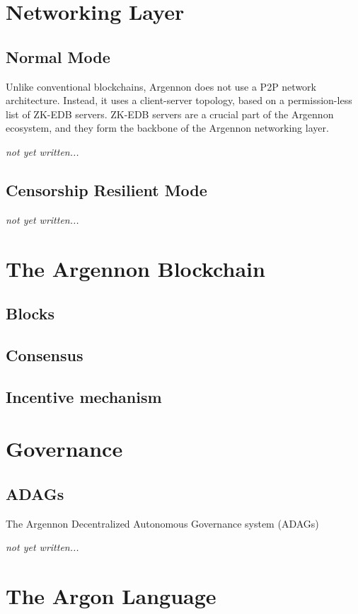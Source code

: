 \documentclass[11pt, a4paper]{report}
\newcommand{\note}[1] {
    \begin{tcolorbox}[colframe=white,colback=white]
        \emph{#1}
    \end{tcolorbox}
}
\begin{document}
    \chapter{Networking Layer}\label{ch:networking}


    \section{Normal Mode}\label{sec:normal-mode}
    Unlike conventional blockchains, Argennon does not use a P2P network architecture. Instead, it uses a
    client-server topology, based on a permission-less list of ZK-EDB servers. ZK-EDB servers are a
    crucial part of the Argennon ecosystem, and they form the backbone of the Argennon networking layer.
    \note{not yet written...}


    \section{Censorship Resilient Mode}\label{sec:cens-res-mode}
    \note{not yet written...}


    \chapter{The Argennon Blockchain}\label{ch:argennon-blockchain}


    \section{Blocks}\label{sec:blocks}
    


    \section{Consensus}\label{sec:consensus}
    

    


    \section{Incentive mechanism}\label{sec:incentive-mechanism}
    


    \chapter{Governance}\label{ch:governance}


    \section{ADAGs}\label{sec:adags}
    The Argennon Decentralized Autonomous Governance system (ADAGs)
    \note{not yet written...}


    \chapter{The Argon Language}\label{ch:argon-lang}
    
\end{document}
